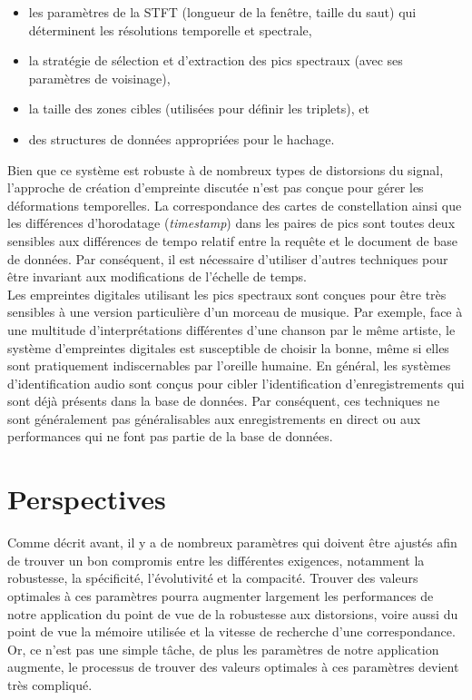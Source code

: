 \documentclass[10pt, english]{report}
\begin{document}
 \begin{itemize}
	\item les paramètres de la STFT (longueur de la fenêtre, taille du saut) qui déterminent les résolutions temporelle et spectrale,
	\item la stratégie de sélection et d'extraction des pics spectraux (avec ses paramètres de voisinage),
	\item la taille des zones cibles (utilisées pour définir les triplets), et
	\item des structures de données appropriées pour le hachage.
\end{itemize}

\vspace{0.5cm}
Bien que ce système est robuste à de nombreux types de distorsions du signal, l'approche de création d'empreinte discutée n'est pas conçue pour gérer les déformations temporelles. La correspondance des cartes de constellation ainsi que les différences d'horodatage (\textit{timestamp}) dans les paires de pics sont toutes deux sensibles aux différences de tempo relatif entre la requête et le document de base de données. Par conséquent, il est nécessaire d'utiliser d'autres techniques pour être invariant aux modifications de l'échelle de temps.\\

Les empreintes digitales utilisant les pics spectraux sont conçues pour être très sensibles à une version particulière d'un morceau de musique. Par exemple, face à une multitude d'interprétations différentes d'une chanson par le même artiste, le système d'empreintes digitales est susceptible de choisir la bonne, même si elles sont pratiquement indiscernables par l'oreille humaine. En général, les systèmes d'identification audio sont conçus pour cibler l'identification d'enregistrements qui sont déjà présents dans la base de données. Par conséquent, ces techniques ne sont généralement pas généralisables aux enregistrements en direct ou aux performances qui ne font pas partie de la base de données.


\chapter{Perspectives}
Comme décrit avant, il y a de nombreux paramètres qui doivent être ajustés afin de trouver un bon compromis entre les différentes exigences, notamment la robustesse, la spécificité, l'évolutivité et la compacité. Trouver des valeurs optimales à ces paramètres pourra augmenter largement les performances de notre application du point de vue de la robustesse aux distorsions, voire aussi du point de vue la mémoire utilisée et la vitesse de recherche d'une correspondance. Or, ce n'est pas une simple tâche, de plus les paramètres de notre application augmente, le processus de trouver des valeurs optimales à ces paramètres devient très compliqué.\\
\end{document}
